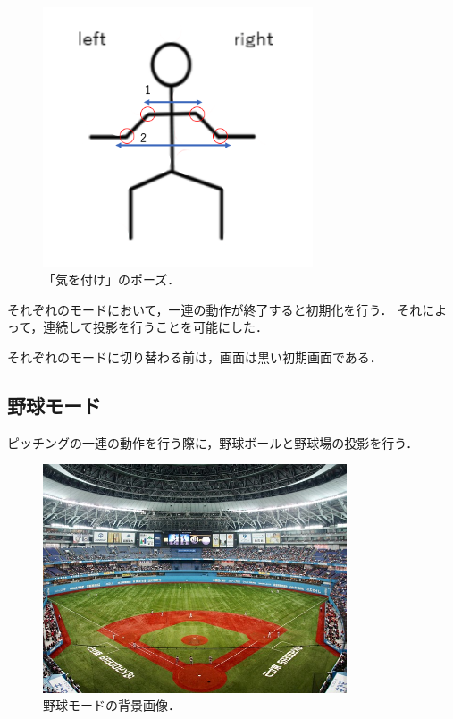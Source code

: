 \vspace{1cm}

\begin{figure}[h]
    \centering
    \includegraphics[width=8cm]{image/kiwotsuke.png}
    \caption[「気を付け」のポーズ]{「気を付け」のポーズ．}
  \label{kiwotsuke}
\end{figure}
\vspace{1cm}

それぞれのモードにおいて，一連の動作が終了すると初期化を行う．
それによって，連続して投影を行うことを可能にした．

それぞれのモードに切り替わる前は，画面は黒い初期画面である．

\clearpage

\subsection{野球モード}
ピッチングの一連の動作を行う際に，野球ボールと野球場の投影を行う．

\vspace{1cm}
\begin{figure}[h]
    \centering
    \includegraphics[width=9cm]{image/baseball_back.jpg}
    \caption[野球モードの背景画像]{野球モードの背景画像\cite{baseballback}．}
  \label{baseballback}
\end{figure}
\vspace{1cm}

